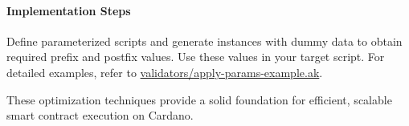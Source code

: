 \paragraph{Implementation Steps}

Define parameterized scripts and generate instances with dummy data to obtain required prefix and postfix values. Use these values in your target script. For detailed examples, refer to \href{https://github.com/Anastasia-Labs/aiken-design-patterns}{validators/apply-params-example.ak}.

These optimization techniques provide a solid foundation for efficient, scalable smart contract execution on Cardano.
